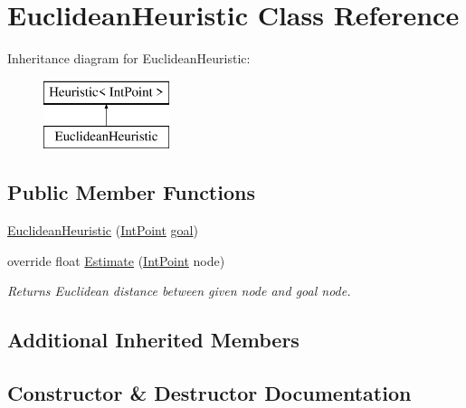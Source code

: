 \hypertarget{class_euclidean_heuristic}{}\section{Euclidean\+Heuristic Class Reference}
\label{class_euclidean_heuristic}
Inheritance diagram for Euclidean\+Heuristic\+:\begin{figure}[H]
\begin{center}
\leavevmode
\includegraphics[height=2.000000cm]{class_euclidean_heuristic}
\end{center}
\end{figure}
\subsection*{Public Member Functions}
\begin{DoxyCompactItemize}
\item 
\mbox{\hyperlink{class_euclidean_heuristic_a19c7f55760595e58adfb0cbf5c1e15b8}{Euclidean\+Heuristic}} (\mbox{\hyperlink{struct_int_point}{Int\+Point}} \mbox{\hyperlink{class_heuristic_a9b7078c615bf30ac77f026a737d6169a}{goal}})
\item 
override float \mbox{\hyperlink{class_euclidean_heuristic_a99dffc6647fe187d9b24f64c71f4e6a3}{Estimate}} (\mbox{\hyperlink{struct_int_point}{Int\+Point}} node)
\begin{DoxyCompactList}\small\item\em Returns Euclidean distance between given node and goal node. \end{DoxyCompactList}\end{DoxyCompactItemize}
\subsection*{Additional Inherited Members}


\subsection{Constructor \& Destructor Documentation}
\mbox{\label{class_euclidean_heuristic_a19c7f55760595e58adfb0cbf5c1e15b8}} 
